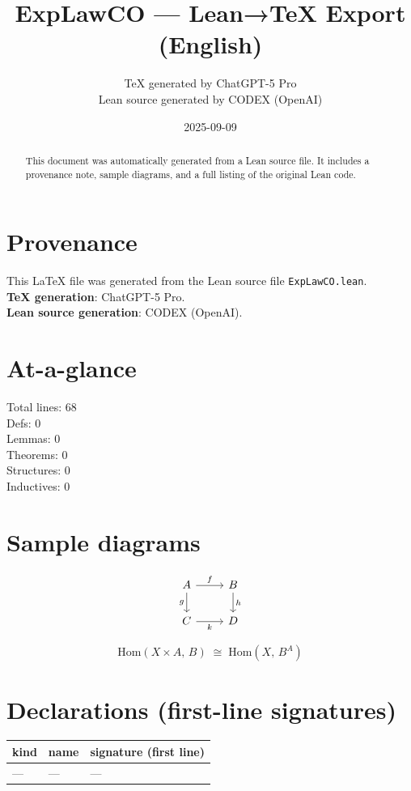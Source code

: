 \documentclass[12pt]{article}
\title{ExpLawCO — Lean→TeX Export (English)}
\author{TeX generated by ChatGPT-5 Pro\\Lean source generated by CODEX (OpenAI)}
\date{2025-09-09}
\begin{document}
\maketitle

\begin{abstract}
This document was automatically generated from a Lean source file. It includes a provenance note, sample diagrams, and a full listing of the original Lean code.
\end{abstract}

\section*{Provenance}
This \LaTeX{} file was generated from the Lean source file \texttt{ExpLawCO.lean}.\\
\textbf{TeX generation}: ChatGPT-5 Pro.\\
\textbf{Lean source generation}: CODEX (OpenAI).

\section*{At-a-glance}
Total lines: 68\\
Defs: 0\\
Lemmas: 0\\
Theorems: 0\\
Structures: 0\\
Inductives: 0

\section*{Sample diagrams}

\[
\begin{tikzcd}
A \arrow[r, "f"] \arrow[d, "g"'] & B \arrow[d, "h"] \\
C \arrow[r, "k"'] & D
\end{tikzcd}
\]



\[
\mathrm{Hom}(X\times A,\,B) \;\cong\; \mathrm{Hom}(X,\,B^A)
\]


\section*{Declarations (first-line signatures)} 
\begin{center}
\begin{tabular}{lll}
\textbf{kind} & \textbf{name} & \textbf{signature (first line)} \\ \hline
— & — & — \\
\end{tabular}
\end{center}
\end{document}
